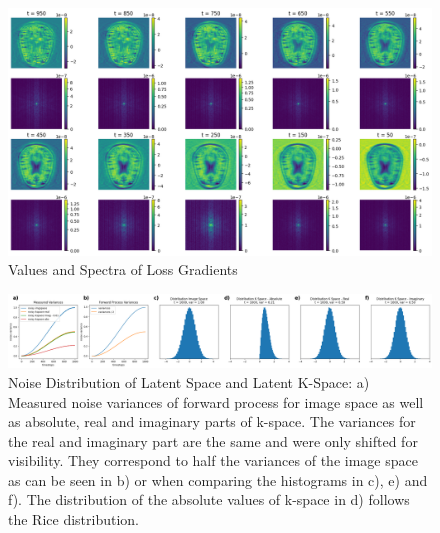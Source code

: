 \begin{figure}[h]
    \centering
    \includegraphics[width=.66\textwidth]{images/gradientspectra.png}
    \caption[Values and Spectra of Loss Gradients]{Values and Spectra of Loss Gradients}
    \label{fig:lossgradients}
\end{figure}

\begin{figure}[h]
    \centering
    \includegraphics[width=\textwidth]{images/kspacedistribution.png}
    \caption[Noise Distribution of Latent K-Space]{Noise Distribution of Latent Space and Latent K-Space: a) Measured noise variances of forward process for image space as well as absolute, real and imaginary parts of k-space. The variances for the real and imaginary part are the same and were only shifted for visibility. They correspond to half the variances of the image space as can be seen in b) or when comparing the histograms in c), e) and f). The distribution of the absolute values of k-space in d) follows the Rice distribution.}
    \label{fig:kspacedistribution}
\end{figure}

